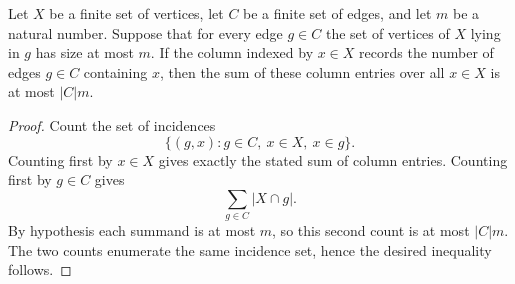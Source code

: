 \begin{helper}
Let $X$ be a finite set of vertices, let $C$ be a finite set of edges, and
let $m$ be a natural number.  Suppose that for every edge $g\in C$ the set
of vertices of $X$ lying in $g$ has size at most $m$.  If the column indexed
by $x\in X$ records the number of edges $g\in C$ containing $x$, then the
sum of these column entries over all $x\in X$ is at most $|C|m$.
\end{helper}
\begin{proof}
Count the set of incidences
\[
\{(g,x): g\in C,\ x\in X,\ x\in g\}.
\]
Counting first by $x\in X$ gives exactly the stated sum of column entries.
Counting first by $g\in C$ gives
\[
\sum_{g\in C}|X\cap g|.
\]
By hypothesis each summand is at most $m$, so this second count is at most
$|C|m$.  The two counts enumerate the same incidence set, hence the desired
inequality follows.
\end{proof}
